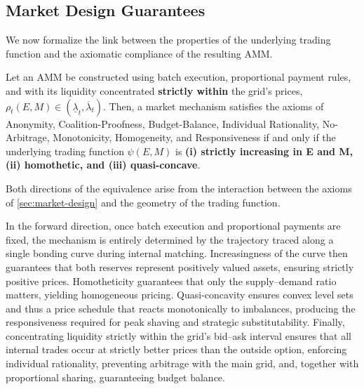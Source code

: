\documentclass[12pt, notitlepage]{article}
\begin{document}
\subsection{Market Design Guarantees}

We now formalize the link between the properties of the underlying trading function and the axiomatic compliance of the resulting AMM.


\begin{proposition}
\label{prop:general-compliance}
Let an AMM be constructed using batch execution, proportional payment rules, and with its liquidity concentrated \textbf{strictly within} the grid's prices, $\rho_t(E,M) \in (\underline{\lambda}_t, \overline{\lambda}_t)$. Then, a market mechanism satisfies the axioms of Anonymity, Coalition-Proofness, Budget-Balance, Individual Rationality, No-Arbitrage, Monotonicity, Homogeneity, and Responsiveness if and only if the underlying trading function $\psi(E,M)$ is \textbf{(i) strictly increasing in E and M, (ii) homothetic, and (iii) quasi-concave}. 
\end{proposition}


Both directions of the equivalence arise from the  interaction between the axioms of \cref{sec:market-design} and the geometry of the trading function. 

In the forward direction, once batch execution and proportional payments are fixed, the mechanism is entirely determined by the trajectory traced along a single bonding curve during internal matching. Increasingness of the curve then guarantees that both reserves represent positively valued assets, ensuring strictly positive prices. Homotheticity guarantees that only the supply--demand ratio matters, yielding homogeneous pricing. Quasi-concavity ensures convex level sets and thus a price schedule that reacts monotonically to imbalances, producing the responsiveness required for peak shaving and strategic substitutability. Finally, concentrating liquidity strictly within the grid's bid--ask interval ensures that all internal trades occur at strictly better prices than the outside option, enforcing individual rationality, preventing arbitrage with the main grid, and, together with proportional sharing, guaranteeing budget balance.
\end{document}
